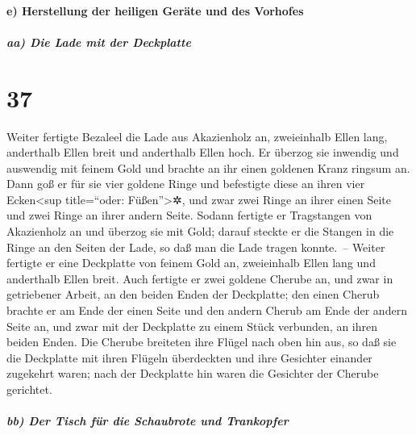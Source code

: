 \hypertarget{e-herstellung-der-heiligen-geruxe4te-und-des-vorhofes}{%
\paragraph{e) Herstellung der heiligen Geräte und des
Vorhofes}\label{e-herstellung-der-heiligen-geruxe4te-und-des-vorhofes}}

\hypertarget{aa-die-lade-mit-der-deckplatte}{%
\subparagraph{aa) Die Lade mit der
Deckplatte}\label{aa-die-lade-mit-der-deckplatte}}

\hypertarget{section-36}{%
\section{37}\label{section-36}}

 Weiter fertigte Bezaleel die Lade aus Akazienholz an,
zweieinhalb Ellen lang, anderthalb Ellen breit und anderthalb Ellen
hoch.  Er überzog sie inwendig und auswendig mit feinem
Gold und brachte an ihr einen goldenen Kranz ringsum an. 
Dann goß er für sie vier goldene Ringe und befestigte diese an ihren
vier Ecken\textless sup title=``oder: Füßen''\textgreater✲, und zwar
zwei Ringe an ihrer einen Seite und zwei Ringe an ihrer andern Seite.
 Sodann fertigte er Tragstangen von Akazienholz an und
überzog sie mit Gold;  darauf steckte er die Stangen in
die Ringe an den Seiten der Lade, so daß man die Lade tragen konnte.~--
 Weiter fertigte er eine Deckplatte von feinem Gold an,
zweieinhalb Ellen lang und anderthalb Ellen breit.  Auch
fertigte er zwei goldene Cherube an, und zwar in getriebener Arbeit, an
den beiden Enden der Deckplatte;  den einen Cherub brachte
er am Ende der einen Seite und den andern Cherub am Ende der andern
Seite an, und zwar mit der Deckplatte zu einem Stück verbunden, an ihren
beiden Enden.  Die Cherube breiteten ihre Flügel nach oben
hin aus, so daß sie die Deckplatte mit ihren Flügeln überdeckten und
ihre Gesichter einander zugekehrt waren; nach der Deckplatte hin waren
die Gesichter der Cherube gerichtet.

\hypertarget{bb-der-tisch-fuxfcr-die-schaubrote-und-trankopfer}{%
\subparagraph{bb) Der Tisch für die Schaubrote und
Trankopfer}\label{bb-der-tisch-fuxfcr-die-schaubrote-und-trankopfer}}

